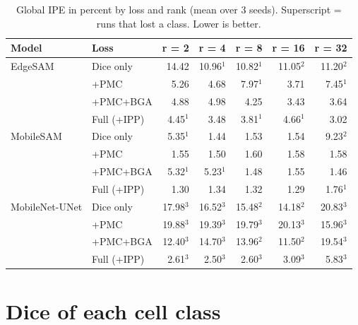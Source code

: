 \documentclass[10pt]{article}
\begin{document}
\begin{table}[H]\centering\footnotesize
\begin{tabular}{l l r r r r r}
\toprule
Model & Loss & r = 2 & r = 4 & r = 8 & r = 16 & r = 32 \\
\midrule
EdgeSAM & Dice only & 14.42 & 10.96$^{1}$ & 10.82$^{1}$ & 11.05$^{2}$ & 11.20$^{2}$ \\
 & +PMC & 5.26 & 4.68 & 7.97$^{1}$ & 3.71 & 7.45$^{1}$ \\
 & +PMC+BGA & 4.88 & 4.98 & 4.25 & 3.43 & 3.64 \\
 & Full (+IPP) & 4.45$^{1}$ & 3.48 & 3.81$^{1}$ & 4.66$^{1}$ & 3.02 \\
\midrule
MobileSAM & Dice only & 5.35$^{1}$ & 1.44 & 1.53 & 1.54 & 9.23$^{2}$ \\
 & +PMC & 1.55 & 1.50 & 1.60 & 1.58 & 1.58 \\
 & +PMC+BGA & 5.32$^{1}$ & 5.23$^{1}$ & 1.48 & 1.55 & 1.46 \\
 & Full (+IPP) & 1.30 & 1.34 & 1.32 & 1.29 & 1.76$^{1}$ \\
\midrule
MobileNet-UNet & Dice only & 17.98$^{3}$ & 16.52$^{3}$ & 15.48$^{2}$ & 14.18$^{2}$ & 20.83$^{3}$ \\
 & +PMC & 19.88$^{3}$ & 19.39$^{3}$ & 19.79$^{3}$ & 20.13$^{3}$ & 15.96$^{3}$ \\
 & +PMC+BGA & 12.40$^{3}$ & 14.70$^{3}$ & 13.96$^{2}$ & 11.50$^{2}$ & 19.54$^{3}$ \\
 & Full (+IPP) & 2.61$^{3}$ & 2.50$^{3}$ & 2.60$^{3}$ & 3.09$^{3}$ & 5.83$^{3}$ \\
\bottomrule
\end{tabular}
\caption{Global IPE in percent by loss and rank (mean over 3 seeds). Superscript = runs that lost a class. Lower is better.}\label{tab:ipe_matrix}
\end{table}

\section*{Dice of each cell class}
\end{document}
